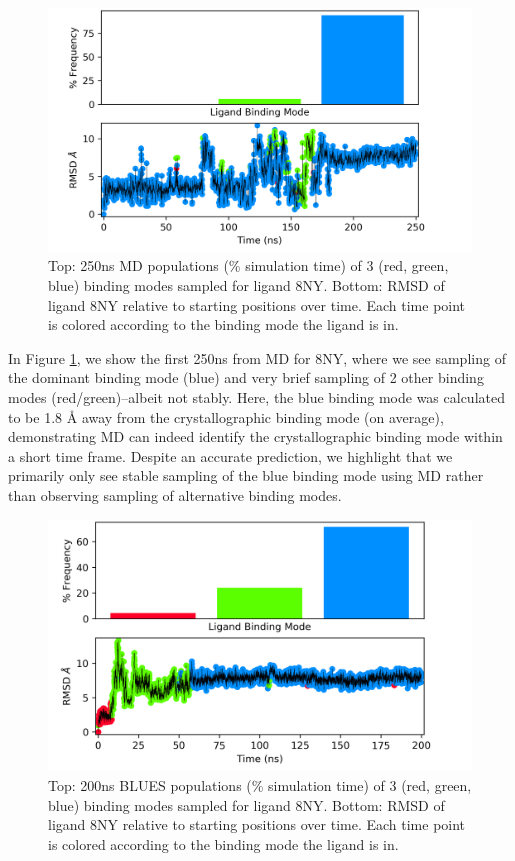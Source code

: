 \begin{figure}
    \centering
    \includegraphics{chapter6/Figures/8NY_c0-prod00.png}
    \caption[8NY MD populations]{Top: 250ns MD populations (\% simulation time) of 3 (red, green, blue) binding modes sampled for ligand 8NY. Bottom: RMSD of ligand 8NY relative to starting positions over time. Each time point is colored according to the binding mode the ligand is in.}
    \label{fig:8NY_c0-md}
\end{figure}

In Figure \ref{fig:8NY_c0-md}, we show the first 250ns from MD for 8NY, where we see sampling of the dominant binding mode (blue) and very brief sampling of 2 other binding modes (red/green)--albeit not stably.
Here, the blue binding mode was calculated to be 1.8 {\AA} away from the crystallographic binding mode (on average), demonstrating MD can indeed identify the crystallographic binding mode within a short time frame.
Despite an accurate prediction, we highlight that we primarily only see stable sampling of the blue binding mode using MD rather than observing sampling of alternative binding modes.

\begin{figure}
    \centering
    \includegraphics{chapter6/Figures/8NY_c0-14708877.png}
    \caption{Top: 200ns BLUES populations (\% simulation time) of 3 (red, green, blue) binding modes sampled for ligand 8NY. Bottom: RMSD of ligand 8NY relative to starting positions over time. Each time point is colored according to the binding mode the ligand is in.}
    \label{fig:8NY_c0-blues}
\end{figure}

